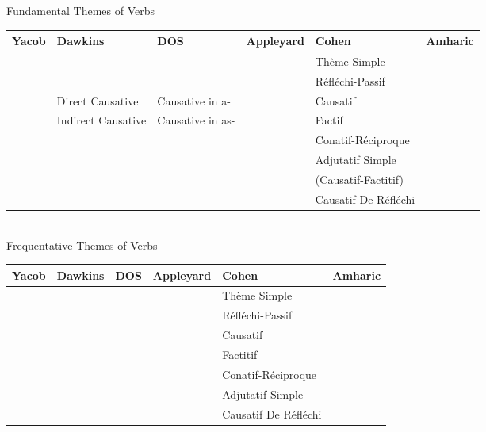 


\vspace{0.2in}
\noi
Fundamental Themes of Verbs \\
\begin{tabular}{|*{6}{l|}}  \hline
       Yacob & Dawkins              & DOS                & Appleyard          & Cohen                        & Amharic \\ \hline \hline
             &                      &                    & & Th\`{e}me Simple             &         \\ \hline
             &                      &                    & & R\'{e}fl\'{e}chi-Passif      &         \\ \hline
             & Direct Causative     & Causative in a-    & & Causatif                     &          \\ \hline
             & Indirect Causative   & Causative in as-   & & Factif                       &         \\ \hline
             &                      &                    & & Conatif-R\'{e}ciproque       &         \\ \hline
             &                      &                    & & Adjutatif Simple             &         \\ \hline 
             &                      &                    & & (Causatif-Factitif)          &         \\ \hline
             &                      &                    & & Causatif De R\'{e}fl\'{e}chi &         \\ \hline
\end{tabular} \\

\vspace{0.2in}
\noi
Frequentative Themes of Verbs \\
\begin{tabular}{|l|l|l|l|l|l|} \hline
  Yacob   & Dawkins       & DOS                & Appleyard          & Cohen                        & Amharic \\ \hline
          & & & & Th\`{e}me Simple             &         \\ \hline
          & & & & R\'{e}fl\'{e}chi-Passif      &         \\ \hline
          & & & & Causatif                     &         \\ \hline
          & & & & Factitif                     &         \\ \hline
          & & & & Conatif-R\'{e}ciproque       &         \\ \hline
          & & & & Adjutatif Simple             &         \\ \hline
          & & & & Causatif De R\'{e}fl\'{e}chi &         \\ \hline
\end{tabular} \\

